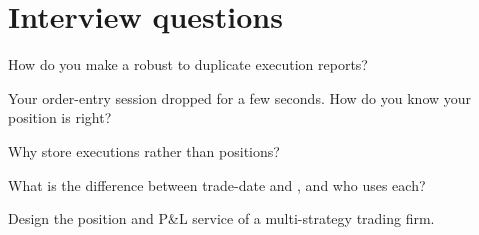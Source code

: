 \section{Interview questions}

\begin{interviewq}\label{iq:pl:position-and-pnl-services:1}
How do you make a  robust to duplicate execution reports?
\end{interviewq}

\begin{interviewq}\label{iq:pl:position-and-pnl-services:2}
Your order-entry session dropped for a few seconds. How do you know your position is right?
\end{interviewq}

\begin{interviewq}\label{iq:pl:position-and-pnl-services:3}
Why store executions rather than positions?
\end{interviewq}

\begin{interviewq}\label{iq:pl:position-and-pnl-services:4}
What is the difference between trade-date and , and who uses each?
\end{interviewq}

\begin{interviewq}\label{iq:pl:position-and-pnl-services:5}
Design the position and P\&L service of a multi-strategy trading firm.
\end{interviewq}
